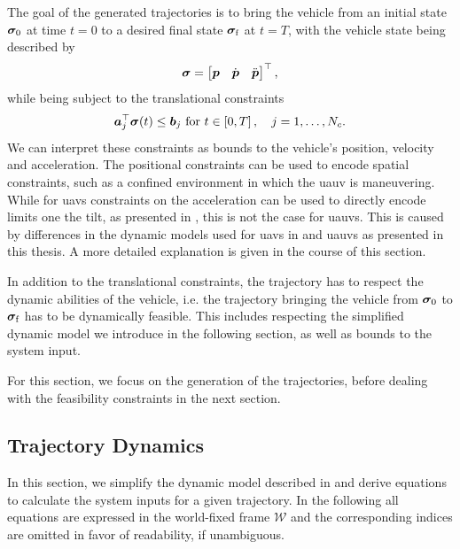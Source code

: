 The goal of the generated trajectories is to bring the vehicle from an initial state $\bm{\sigma}_0$ at time $t=0$ to a desired final state $\bm{\sigma}_{\text{f}}$ at $t=T$, with the vehicle state being described by 
\begin{equation}
	\bm{\sigma} = 
	\begin{bmatrix}
		\mbox{$\bm{p}$} & \mbox{$\dot{\bm{p}}$} & \mbox{$\ddot{\bm{p}}$}
	\end{bmatrix}^\top
	,
\end{equation}
while being subject to the translational constraints
\begin{equation}
	\label{eq:translational-constraints}
	\mbox{$\bm{a}$}_j^\top \bm{\sigma}(t) \leq \mbox{$\bm{b}$}_j
	\text{ for }
	t \in \left[0,T\right],
	\quad
	j=1,\dots,N_c
	.
\end{equation}
We can interpret these constraints as bounds to the vehicle's position, velocity and acceleration. The positional constraints can be used to encode spatial constraints, such as a confined environment in which the \ac{uauv} is maneuvering. While for \acp{uav} constraints on the acceleration can be used to directly encode limits one the tilt, as presented in \cite{MuellerHehn15}, this is not the case for \acp{uauv}. This is caused by differences in the dynamic models used for \acp{uav} in \cite{MuellerHehn15} and \acp{uauv} as presented in this thesis. A more detailed explanation is given in the course of this section.

In addition to the translational constraints, the trajectory has to respect the dynamic abilities of the vehicle, i.e. the trajectory bringing the vehicle from $\bm{\sigma}_0$ to $\bm{\sigma}_\text{f}$ has to be dynamically feasible. This includes respecting the simplified dynamic model we introduce in the following section, as well as bounds to the system input.

For this section, we focus on the generation of the trajectories, before dealing with the feasibility constraints in the next section.

\subsection{Trajectory Dynamics}
\label{sec:trajectory-dynamics}
In this section, we simplify the dynamic model described in  and derive equations to calculate the system inputs for a given trajectory. In the following all equations are expressed in the world-fixed frame $\mathcal{W}$ and the corresponding indices are omitted in favor of readability, if unambiguous.

